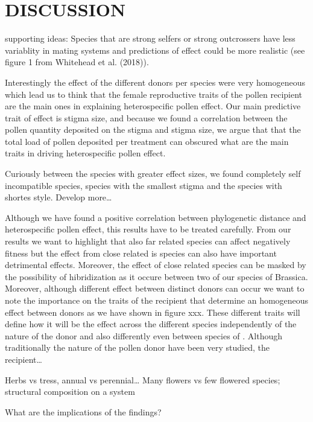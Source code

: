 \documentclass[11pt,a4paper]{article}
\begin{document}
\newpage

\section{DISCUSSION}\label{discussion}

supporting ideas: Species that are strong selfers or strong outcrossers
have less variablity in mating systems and predictions of effect could
be more realistic (see figure 1 from Whitehead et al. (2018)).

Interestingly the effect of the different donors per species were very
homogeneous which lead us to think that the female reproductive traits
of the pollen recipient are the main ones in explaining heterospecific
pollen effect. Our main predictive trait of effect is stigma size, and
because we found a correlation between the pollen quantity deposited on
the stigma and stigma size, we argue that that the total load of pollen
deposited per treatment can obscured what are the main traits in driving
heterospecific pollen effect.

Curiously between the species with greater effect sizes, we found
completely self incompatible species, species with the smallest stigma
and the species with shortes style. Develop more\ldots{}

Although we have found a positive correlation between phylogenetic
distance and heterospecific pollen effect, this results have to be
treated carefully. From our results we want to highlight that also far
related species can affect negatively fitness but the effect from close
related is species can also have important detrimental effects.
Moreover, the effect of close related species can be masked by the
possibility of hibridization as it occure between two of our species of
Brassica. Moreover, although different effect between distinct donors
can occur we want to note the importance on the traits of the recipient
that determine an homogeneous effect between donors as we have shown in
figure xxx. These different traits will define how it will be the effect
across the different species independently of the nature of the donor
and also differently even between species of . Although traditionally
the nature of the pollen donor have been very studied, the
recipient\ldots{}

Herbs vs tress, annual vs perennial\ldots{} Many flowers vs few flowered
species; structural composition on a system

What are the implications of the findings?
\end{document}
